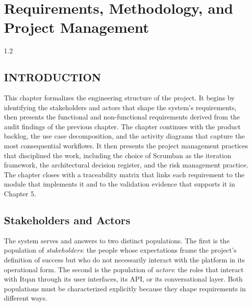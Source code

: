 \chapter{Requirements, Methodology, and Project Management}
\begin{spacing}{1.2}
\minitoc
\thispagestyle{MyStyle}
\end{spacing}
\newpage

\section{INTRODUCTION}
This chapter formalizes the engineering structure of the project. It begins by identifying the stakeholders and actors that shape the system's requirements, then presents the functional and non-functional requirements derived from the audit findings of the previous chapter. The chapter continues with the product backlog, the use case decomposition, and the activity diagrams that capture the most consequential workflows. It then presents the project management practices that disciplined the work, including the choice of Scrumban as the iteration framework, the architectural decision register, and the risk management practice. The chapter closes with a traceability matrix that links each requirement to the module that implements it and to the validation evidence that supports it in Chapter 5.

\section{Stakeholders and Actors}
The system serves and answers to two distinct populations. The first is the population of \textit{stakeholders}: the people whose expectations frame the project's definition of success but who do not necessarily interact with the platform in its operational form. The second is the population of \textit{actors}: the roles that interact with Itqan through its user interfaces, its API, or its conversational layer. Both populations must be characterized explicitly because they shape requirements in different ways.


